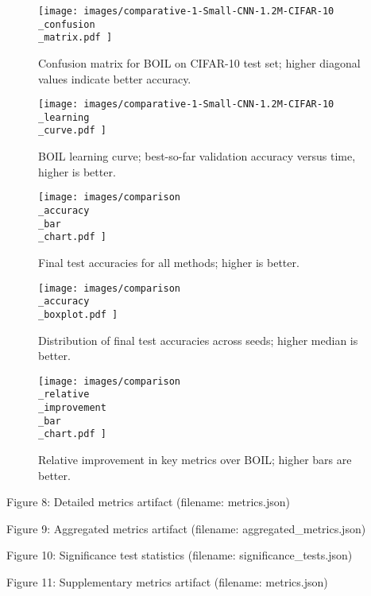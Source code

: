 \documentclass{article} %
\begin{document}
\begin{figure}[H]
  \centering
  \texttt{[image:  images/comparative-1-Small-CNN-1.2M-CIFAR-10\\\_confusion\\\_matrix.pdf ]}
  \caption{Confusion matrix for BOIL on CIFAR-10 test set; higher diagonal values indicate better accuracy.}
\end{figure}

\begin{figure}[H]
  \centering
  \texttt{[image:  images/comparative-1-Small-CNN-1.2M-CIFAR-10\\\_learning\\\_curve.pdf ]}
  \caption{BOIL learning curve; best-so-far validation accuracy versus time, higher is better.}
\end{figure}

\begin{figure}[H]
  \centering
  \texttt{[image:  images/comparison\\\_accuracy\\\_bar\\\_chart.pdf ]}
  \caption{Final test accuracies for all methods; higher is better.}
\end{figure}

\begin{figure}[H]
  \centering
  \texttt{[image:  images/comparison\\\_accuracy\\\_boxplot.pdf ]}
  \caption{Distribution of final test accuracies across seeds; higher median is better.}
\end{figure}

\begin{figure}[H]
  \centering
  \texttt{[image:  images/comparison\\\_relative\\\_improvement\\\_bar\\\_chart.pdf ]}
  \caption{Relative improvement in key metrics over BOIL; higher bars are better.}
\end{figure}

Figure 8: Detailed metrics artifact (filename: metrics.json)

Figure 9: Aggregated metrics artifact (filename: aggregated\_metrics.json)

Figure 10: Significance test statistics (filename: significance\_tests.json)

Figure 11: Supplementary metrics artifact (filename: metrics.json)
\end{document}
